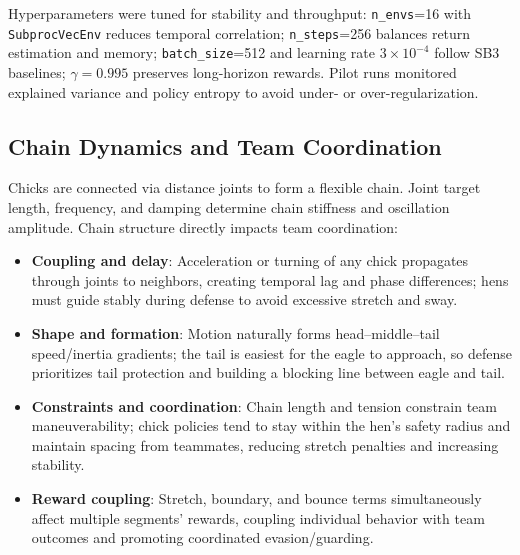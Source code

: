 \documentclass[12pt]{article}
\begin{document}
Hyperparameters were tuned for stability and throughput: \texttt{n\_envs}=16 with \texttt{SubprocVecEnv} reduces temporal correlation; \texttt{n\_steps}=256 balances return estimation and memory; \texttt{batch\_size}=512 and learning rate \(3\times10^{-4}\) follow SB3 baselines; \(\gamma=0.995\) preserves long-horizon rewards. Pilot runs monitored explained variance and policy entropy to avoid under- or over-regularization.

\subsection{Chain Dynamics and Team Coordination}
Chicks are connected via distance joints to form a flexible chain. Joint target length, frequency, and damping determine chain stiffness and oscillation amplitude. Chain structure directly impacts team coordination:
\begin{itemize}
\item \textbf{Coupling and delay}: Acceleration or turning of any chick propagates through joints to neighbors, creating temporal lag and phase differences; hens must guide stably during defense to avoid excessive stretch and sway.
\item \textbf{Shape and formation}: Motion naturally forms head–middle–tail speed/inertia gradients; the tail is easiest for the eagle to approach, so defense prioritizes tail protection and building a blocking line between eagle and tail.
\item \textbf{Constraints and coordination}: Chain length and tension constrain team maneuverability; chick policies tend to stay within the hen’s safety radius and maintain spacing from teammates, reducing stretch penalties and increasing stability.
\item \textbf{Reward coupling}: Stretch, boundary, and bounce terms simultaneously affect multiple segments’ rewards, coupling individual behavior with team outcomes and promoting coordinated evasion/guarding.
\end{itemize}
\end{document}
